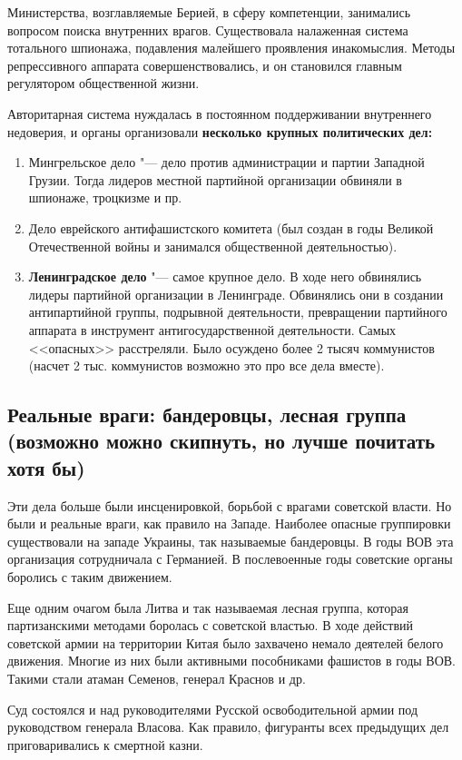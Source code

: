 Министерства, возглавляемые Берией, в сферу компетенции, занимались вопросом поиска внутренних врагов. Существовала налаженная система тотального шпионажа, подавления малейшего проявления инакомыслия. Методы репрессивного аппарата совершенствовались, и он становился главным регулятором общественной жизни. 

Авторитарная система нуждалась в постоянном поддерживании внутреннего недоверия, и органы организовали \textbf{несколько крупных политических дел:} 

\begin{enumerate}
    \item Мингрельское дело "--- дело против администрации и партии Западной Грузии. Тогда лидеров местной партийной организации обвиняли в шпионаже, троцкизме и пр.
    \item Дело еврейского антифашистского комитета (был создан в годы Великой Отечественной войны и занимался общественной деятельностью).
    \item \textbf{Ленинградское дело} "--- самое крупное дело. В ходе него обвинялись лидеры партийной организации в Ленинграде. Обвинялись они в создании антипартийной группы, подрывной деятельности, превращении партийного аппарата в инструмент антигосударственной деятельности. Самых <<опасных>> расстреляли. Было осуждено более 2 тысяч коммунистов (насчет 2 тыс. коммунистов возможно это про все дела вместе).
\end{enumerate}

\subsection{Реальные враги: бандеровцы, лесная группа (возможно можно скипнуть, но лучше почитать хотя бы)}

Эти дела больше были инсценировкой, борьбой с врагами советской власти. Но были и реальные враги, как правило на Западе. Наиболее опасные группировки существовали на западе Украины, так называемые бандеровцы. В годы ВОВ эта организация сотрудничала с Германией. В послевоенные годы советские органы боролись с таким движением.

Еще одним очагом была Литва и так называемая лесная группа, которая партизанскими методами боролась с советской властью. В ходе действий советской армии на территории Китая было захвачено немало деятелей белого движения. Многие из них были активными пособниками фашистов в годы ВОВ. Такими стали атаман Семенов, генерал Краснов и др.

Суд состоялся и над руководителями Русской освободительной армии под руководством генерала Власова. Как правило, фигуранты всех предыдущих дел приговаривались к смертной казни.

